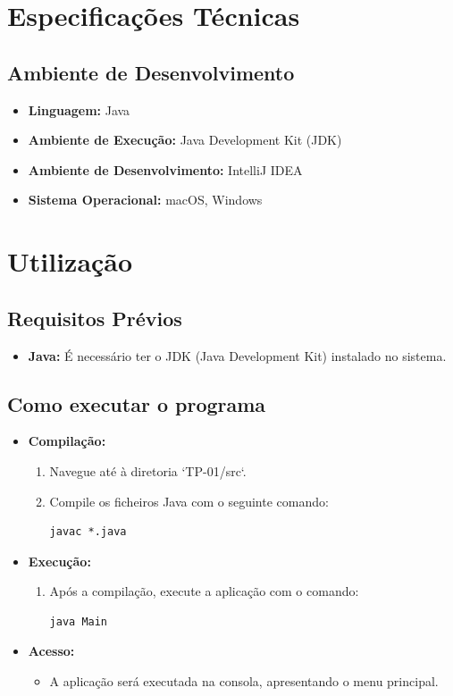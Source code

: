 \documentclass[a4paper,12pt]{article}
\begin{document}
\section{Especificações Técnicas}

\subsection{Ambiente de Desenvolvimento}
\begin{itemize}
    \item \textbf{Linguagem:} Java
    \item \textbf{Ambiente de Execução:} Java Development Kit (JDK)
    \item \textbf{Ambiente de Desenvolvimento:} IntelliJ IDEA
    \item \textbf{Sistema Operacional:} macOS, Windows
\end{itemize}

\section{Utilização}
\subsection{Requisitos Prévios}
\begin{itemize}
    \item \textbf{Java:} É necessário ter o JDK (Java Development Kit) instalado no sistema.
\end{itemize}

\subsection{Como executar o programa}
\begin{itemize}
    \item \textbf{Compilação:}
    \begin{enumerate}
        \item Navegue até à diretoria `TP-01/src`.
        \item Compile os ficheiros Java com o seguinte comando:
            \begin{verbatim}
javac *.java
            \end{verbatim}
    \end{enumerate}
    \item \textbf{Execução:}
    \begin{enumerate}
        \item Após a compilação, execute a aplicação com o comando:
            \begin{verbatim}
java Main
            \end{verbatim}
    \end{enumerate}
    \item \textbf{Acesso:}
    \begin{itemize}
        \item A aplicação será executada na consola, apresentando o menu principal.
    \end{itemize}
\end{itemize}
\end{document}
